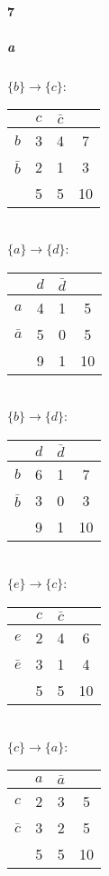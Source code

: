 \documentclass[22pt]{article}
\begin{document}
	\paragraph{7}
		\subparagraph{a} $\{b\} \rightarrow \{c\}$:
		\begin{tabular}{|c|c|c|c|}
		\hline
		& $c$ &$\bar{c}$ & \\ \hline
		$b$ &3&4 & 7\\ \hline
		$\bar{b}$ &2 & 1& 3\\ \hline
		& 5 &5 & 10 \\ \hline
		\end{tabular}\\[1ex]

		$\{a\} \rightarrow \{d\}$:
		\begin{tabular}{|c|c|c|c|}
		\hline
		& $d$ &$\bar{d}$ & \\ \hline
		$a$ &4&1 & 5\\ \hline
		$\bar{a}$ &5 & 0& 5\\ \hline
		& 9 &1 & 10 \\ \hline
		\end{tabular}\\[1ex]

		$\{b\} \rightarrow \{d\}$:
		\begin{tabular}{|c|c|c|c|}
		\hline
		& $d$ &$\bar{d}$ & \\ \hline
		$b$ &6&1 & 7\\ \hline
		$\bar{b}$ &3 & 0& 3\\ \hline
		& 9 &1 & 10 \\ \hline
		\end{tabular}\\[1ex]

		$\{e\} \rightarrow \{c\}$:
		\begin{tabular}{|c|c|c|c|}
		\hline
		& $c$ &$\bar{c}$ & \\ \hline
		$e$ &2&4 & 6\\ \hline
		$\bar{e}$ &3 & 1& 4\\ \hline
		& 5 &5 & 10 \\ \hline
		\end{tabular}\\[1ex]

		$\{c\} \rightarrow \{a\}$:
		\begin{tabular}{|c|c|c|c|}
		\hline
		& $a$ &$\bar{a}$ & \\ \hline
		$c$ &2&3 & 5\\ \hline
		$\bar{c}$ &3 & 2& 5\\ \hline
		& 5 &5 & 10 \\ \hline
		\end{tabular}\\[1ex]
\end{document}
